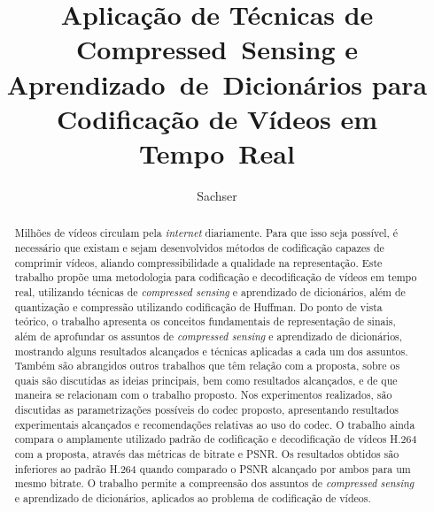 \documentclass[cic,tc]{iiufrgs}
\title{Aplicação de Técnicas de Compressed~Sensing e Aprendizado~de~Dicionários para Codificação de Vídeos em Tempo~Real}
\author{Sachser}{Eduardo}
\begin{document}
\maketitle





\begin{abstract}
    Milhões de vídeos circulam pela \emph{internet} diariamente.
    Para que isso seja possível, é necessário que existam e sejam 
    desenvolvidos métodos de codificação capazes de comprimir vídeos, 
    aliando compressibilidade a qualidade na representação.
    Este trabalho propõe uma metodologia para codificação e decodificação de 
    vídeos em tempo real, utilizando técnicas de \emph{compressed sensing} e aprendizado 
    de dicionários, além de quantização e compressão utilizando codificação de Huffman.
    Do ponto de vista teórico, o trabalho apresenta os conceitos fundamentais de representação
    de sinais, além 
    de aprofundar os assuntos de \emph{compressed sensing} e aprendizado de dicionários,
    mostrando alguns resultados alcançados e técnicas aplicadas a cada um dos assuntos.
    Também são abrangidos outros trabalhos que têm relação com a proposta,
    sobre os quais são discutidas as ideias principais, bem como resultados alcançados, e de que 
    maneira se relacionam com o trabalho proposto.
    Nos experimentos realizados, são discutidas as parametrizações possíveis do 
    codec proposto, apresentando resultados experimentais alcançados e recomendações 
    relativas ao uso do codec.
    O trabalho ainda compara o amplamente utilizado padrão de codificação e decodificação 
    de vídeos H.264
    com a proposta, através das métricas de bitrate e PSNR.
    Os resultados obtidos são inferiores ao padrão H.264 quando comparado o PSNR alcançado por ambos
    para um mesmo bitrate.
    O trabalho permite a compreensão dos assuntos
    de \emph{compressed sensing} e aprendizado de dicionários,
    aplicados ao problema de codificação de vídeos.
\end{abstract}
\end{document}
